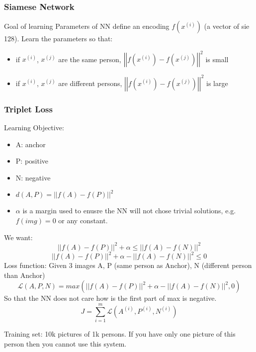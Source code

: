 \subsubsection{Siamese Network}
Goal of learning
Parameters of NN define an encoding $f(x^{(i)})$ (a vector of sie 128). Learn the parameters so that:
\begin{itemize}
    \item if $x^{(i)}$, $x^{(j)}$ are the same person, $\left|\left|f(x^{(i)}) - f(x^{(j)})\right|\right|^2$ is small
    \item if $x^{(i)}$, $x^{(j)}$ are different persons, $\left|\left|f(x^{(i)}) - f(x^{(j)})\right|\right|^2$ is large
\end{itemize}

\subsubsection{Triplet Loss}
Learning Objective:
\begin{itemize}
    \item A: anchor
    \item P: positive
    \item N: negative
    \item $d(A, P) = \left|\left|f(A)-f(P)\right|\right|^2$
    \item $\alpha$ is a margin used to enusre the NN will not chose trivial solutions, e.g. $f(img)=0$ or any constant.
\end{itemize}
We want: 
\begin{equation}
    \left|\left|f(A)-f(P)\right|\right|^2 + \alpha \leq \left|\left|f(A)-f(N)\right|\right|^2
\end{equation}
\begin{equation}
    \left|\left|f(A)-f(P)\right|\right|^2 + \alpha - \left|\left|f(A)-f(N)\right|\right|^2 \leq 0
\end{equation}
Loss function:
Given 3 images A, P (same person as Anchor), N (different person than Anchor)
\begin{equation}
\mathcal{L}(A, P, N) = max (\left|\left|f(A)-f(P)\right|\right|^2 + \alpha - \left|\left|f(A)-f(N)\right|\right|^2, 0)
\end{equation}
So that the NN does not care how is the first part of max is negative.
\begin{equation}
J = \sum^m_{i=1} \mathcal{L}(A^{(i)}, P^{(i)}, N^{(i)})
\end{equation}

Training set: 10k pictures of 1k persons. If you have only one picture of this person then you cannot use this system.


